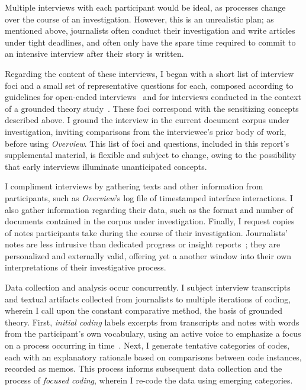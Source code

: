 Multiple interviews with each participant would be ideal, as processes change over the course of an investigation. 
However, this is an unrealistic plan; as mentioned above, journalists often conduct their investigation and write articles under tight deadlines, and often only have the spare time required to commit to an intensive interview after their story is written. 

Regarding the content of these interviews, I began with a short list of interview foci and a small set of representative questions for each, composed according to guidelines for open-ended interviews~\cite{Fontana1994} and for interviews conducted in the context of a grounded theory study~\cite{Charmaz2006}. 
These foci correspond with the sensitizing concepts described above. 
I ground the interview in the current document corpus under investigation, inviting comparisons from the interviewee's prior body of work, before using {\it Overview}. 
This list of foci and questions, included in this report's supplemental material, is flexible and subject to change, owing to the possibility that early interviews illuminate unanticipated concepts.

I compliment interviews by gathering texts and other information from participants, such as {\it Overview}'s log file of timestamped interface interactions. 
I also gather information regarding their data, such as the format and number of documents contained in the corpus under investigation. 
Finally, I request copies of notes participants take during the course of their investigation.
Journalists' notes are less intrusive than dedicated progress or insight reports~\cite{Rester2007a,Saraiya2006}; they are personalized and externally valid, offering yet a another window into their own interpretations of their investigative process.
 
Data collection and analysis occur concurrently. 
I subject interview transcripts and textual artifacts collected from journalists to multiple iterations of coding, wherein I call upon the constant comparative method, the basis of grounded theory. 
First, {\it initial coding} labels excerpts from transcripts and notes with words from the participant's own vocabulary, using an active voice to emphasize a focus on a process occurring in time~\cite{Charmaz2006}. 
Next, I generate tentative categories of codes, each with an explanatory rationale based on comparisons between code instances, recorded as memos. 
This process informs subsequent data collection and the process of {\it focused coding}, wherein I re-code the data using emerging categories. 

